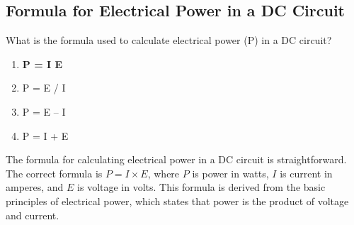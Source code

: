 \subsection{Formula for Electrical Power in a DC Circuit}
\label{T5C08}

\begin{tcolorbox}[colback=gray!10!white,colframe=black!75!black,title=T5C08]
What is the formula used to calculate electrical power (P) in a DC circuit?
\begin{enumerate}[noitemsep]
    \item \textbf{P = I E}
    \item P = E / I
    \item P = E – I
    \item P = I + E
\end{enumerate}
\end{tcolorbox}

The formula for calculating electrical power in a DC circuit is straightforward. The correct formula is \( P = I \times E \), where \( P \) is power in watts, \( I \) is current in amperes, and \( E \) is voltage in volts. This formula is derived from the basic principles of electrical power, which states that power is the product of voltage and current.